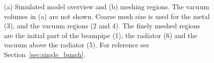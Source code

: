 \begin{figure}[!t]
\centering
{}
\hspace{3mm}
\caption{(a) Simulated model overview and (b) meshing regions. The vacuum volumes in (a) are not shown. Coarse mesh size is used for the metal (3), and the vacuum regions (2 and 4). The finely meshed regions are the initial part of the beampipe (1), the radiator (6) and the vacuum above the radiator (5). For reference see Section~\ref{sec:single_bunch}.}
\label{fig:71deg_model}
\end{figure}





